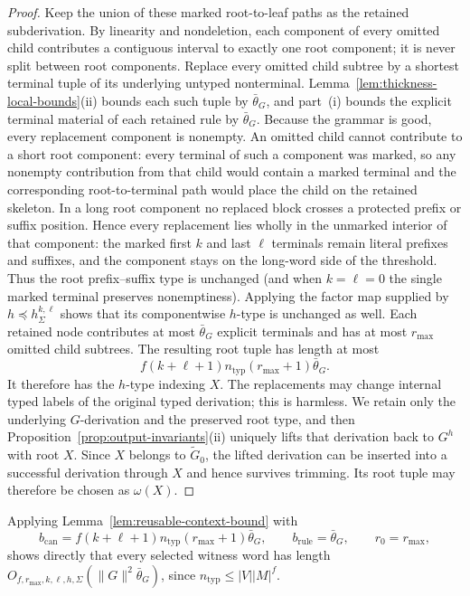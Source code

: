 \documentclass[11pt]{article}
\numberwithin{equation}{section}
\theoremstyle{plain}
\theoremstyle{definition}
\theoremstyle{remark}
\begin{document}
\begin{proof}
Keep the union of these marked root-to-leaf paths as the retained subderivation.  By linearity and nondeletion, each component
of every omitted child contributes a contiguous interval to exactly one root
component; it is never split between root components.  Replace every omitted
child subtree by a shortest terminal tuple of its underlying untyped
nonterminal.  Lemma~\ref{lem:thickness-local-bounds}(ii) bounds each such tuple
by $\bar\theta_G$, and part~(i) bounds the explicit terminal material of each
retained rule by $\bar\theta_G$.  Because the grammar is good, every
replacement component is nonempty.  An omitted child cannot contribute to a
short root component: every terminal of such a component was marked, so any
nonempty contribution from that child would contain a marked terminal and the
corresponding root-to-terminal path would place the child on the retained
skeleton.  In a long root component no replaced block crosses a protected
prefix or suffix position.
Hence every replacement lies wholly in the unmarked interior of that component:
the marked first $k$ and last $\ell$ terminals remain literal prefixes and
suffixes, and the component stays on the long-word side of the threshold.
Thus the root prefix--suffix type is unchanged (and when $k=\ell=0$ the single
marked terminal preserves nonemptiness).  Applying the factor map supplied by
$h\preceq h_\Sigma^{k,\ell}$ shows that its componentwise $h$-type is
unchanged as well.
Each retained node contributes at most $\bar\theta_G$ explicit terminals and
has at most $r_{\max}$ omitted child subtrees.  The resulting root tuple has
length at most
\[
  f(k+\ell+1)n_{\mathrm{typ}}(r_{\max}+1)\bar\theta_G.
\]
It therefore has the $h$-type indexing $X$.  The replacements may change
internal typed labels of the original typed derivation; this is harmless.  We
retain only the underlying $G$-derivation and the preserved root type, and then
Proposition~\ref{prop:output-invariants}(ii) uniquely lifts that derivation back
to $G^h$ with root $X$.  Since $X$ belongs to $\widetilde G_0$, the lifted
derivation can be inserted into a successful derivation through $X$ and hence
survives trimming.  Its root tuple may therefore be chosen as $\omega(X)$.
\end{proof}

Applying Lemma~\ref{lem:reusable-context-bound} with
\[
 b_{\mathrm{can}}
 =f(k+\ell+1)n_{\mathrm{typ}}(r_{\max}+1)\bar\theta_G,
 \qquad
 b_{\mathrm{rule}}=\bar\theta_G,
 \qquad
 r_0=r_{\max},
\]
shows directly that every selected witness word has length
$O_{f,r_{\max},k,\ell,h,\Sigma}(\|G\|^2\bar\theta_G)$, since
$n_{\mathrm{typ}}\le |V||M|^f$.
\end{document}
